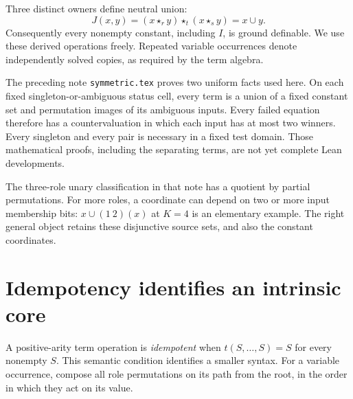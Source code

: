 \documentclass[11pt]{article}
\newcommand{\ow}[1]{\mathbin{\star_{#1}}}
\begin{document}
Three distinct owners define neutral union:
\[
 J(x,y)=(x\ow r y)\ow t(x\ow s y)=x\cup y.
\]
Consequently every nonempty constant, including $I$, is ground definable.
We use these derived operations freely. Repeated variable occurrences
denote independently solved copies, as required by the term algebra.

The preceding note \texttt{symmetric.tex} proves two uniform facts used
here. On each fixed singleton-or-ambiguous status cell, every term is a
union of a fixed constant set and permutation images of its ambiguous
inputs. Every failed
equation therefore has a countervaluation in which each input has at
most two winners. Every singleton and every pair is necessary in a fixed
test domain. Those mathematical proofs, including the separating terms,
are not yet complete Lean developments.

The three-role unary classification in that note has a quotient by
partial permutations. For more roles, a coordinate can depend on two or
more input membership bits: $x\cup(1\ 2)(x)$ at $K=4$ is an elementary
example. The right general object retains these disjunctive source sets,
and also the constant coordinates.

\section{Idempotency identifies an intrinsic core}\label{sec:core}

A positive-arity term operation is \emph{idempotent} when
$t(S,\ldots,S)=S$ for every nonempty $S$. This semantic condition
identifies a smaller syntax. For a variable occurrence, compose all
role permutations on its path from the root, in the order in which
they act on its value.
\end{document}
